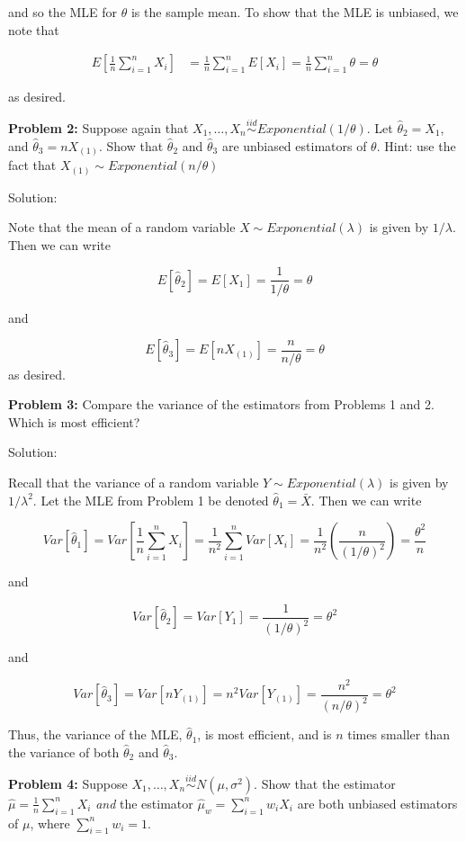 \documentclass[
  letterpaper,
  DIV=11,
  numbers=noendperiod]{scrreprt}
\begin{document}
and so the MLE for \(\theta\) is the sample mean. To show that the MLE
is unbiased, we note that

\begin{align*}
    E \left[ \frac{1}{n} \sum_{i = 1}^n X_i \right] & = \frac{1}{n} \sum_{i = 1}^n E[X_i] = \frac{1}{n} \sum_{i = 1}^n \theta  = \theta
\end{align*}

as desired.

\textbf{Problem 2:} Suppose again that
\(X_1, \dots, X_n \overset{iid}{\sim} Exponential(1/\theta)\). Let
\(\hat{\theta}_2 = X_1\), and \(\hat{\theta}_3 = nX_{(1)}\). Show that
\(\hat{\theta}_2\) and \(\hat{\theta}_3\) are unbiased estimators of
\(\theta\). Hint: use the fact that
\(X_{(1)} \sim Exponential(n/\theta)\)

Solution:

Note that the mean of a random variable \(X \sim Exponential(\lambda)\)
is given by \(1/\lambda\). Then we can write

\[
E[\hat{\theta}_2] = E[X_1] = \frac{1}{1/\theta} = \theta
\]

and

\[
E[\hat{\theta}_3] = E[nX_{(1)}] = \frac{n}{n/\theta} = \theta
\] as desired.

\textbf{Problem 3:} Compare the variance of the estimators from Problems
1 and 2. Which is most efficient?

Solution:

Recall that the variance of a random variable
\(Y \sim Exponential(\lambda)\) is given by \(1/\lambda^2\). Let the MLE
from Problem 1 be denoted \(\hat{\theta}_1 = \bar{X}\). Then we can
write

\[
Var\left[\hat{\theta}_1\right] = Var\left[\frac{1}{n} \sum_{i = 1}^n X_i\right] = \frac{1}{n^2} \sum_{i = 1}^n Var[X_i] = \frac{1}{n^2} \left( \frac{n}{(1/\theta)^2} \right) = \frac{\theta^2}{n}
\]

and

\[
Var\left[\hat{\theta}_2\right] = Var[Y_1] = \frac{1}{(1/\theta)^2} = \theta^2
\]

and

\[
Var\left[\hat{\theta}_3\right] = Var[nY_{(1)}] = n^2 Var[Y_{(1)}] = \frac{n^2}{(n/\theta)^2} = \theta^2
\]

Thus, the variance of the MLE, \(\hat{\theta}_1\), is most efficient,
and is \(n\) times smaller than the variance of both \(\hat{\theta}_2\)
and \(\hat{\theta}_3\).

\textbf{Problem 4:} Suppose
\(X_1, \dots, X_n \overset{iid}{\sim} N(\mu, \sigma^2)\). Show that the
estimator \(\hat{\mu} = \frac{1}{n} \sum_{i = 1}^n X_i\) \emph{and} the
estimator \(\hat{\mu}_w = \sum_{i = 1}^n w_i X_i\) are both unbiased
estimators of \(\mu\), where \(\sum_{i = 1}^n w_i = 1\).
\end{document}
